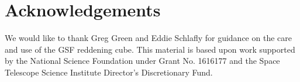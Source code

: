 \section{Acknowledgements}

We would like to thank Greg Green and Eddie Schlafly for guidance on the care and use of the GSF reddening cube.
This material is based upon work supported by the National Science Foundation under Grant No. 1616177 and the Space Telescope Science Institute Director's Discretionary Fund. 

